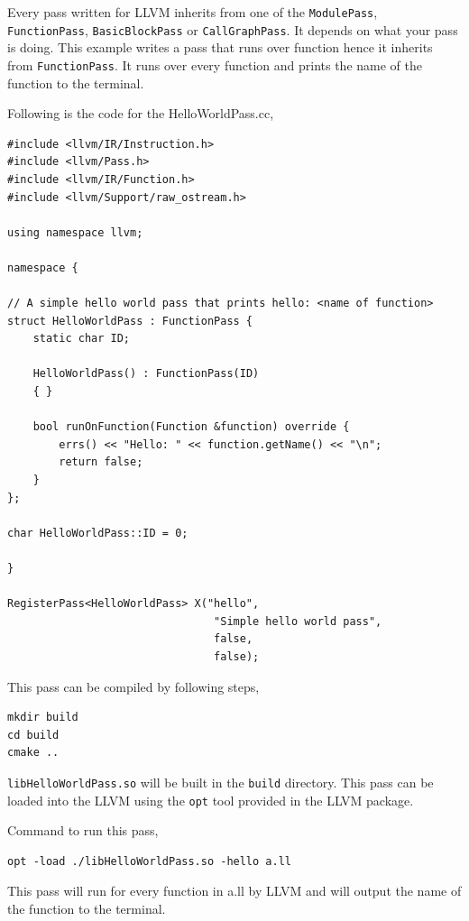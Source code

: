\documentclass[a4paper,12pt]{report}
\begin{document}
Every pass written for LLVM inherits from one of the \texttt{ModulePass}, \texttt{FunctionPass},
\texttt{BasicBlockPass} or \texttt{CallGraphPass}. It depends on what your pass is doing. This example
writes a pass that runs over function hence it inherits from \texttt{FunctionPass}.
It runs over every function and prints the name of the function to the terminal.

Following is the code for the HelloWorldPass.cc,

\begin{verbatim}
#include <llvm/IR/Instruction.h>
#include <llvm/Pass.h>
#include <llvm/IR/Function.h>
#include <llvm/Support/raw_ostream.h>

using namespace llvm;

namespace {

// A simple hello world pass that prints hello: <name of function>
struct HelloWorldPass : FunctionPass {
    static char ID;

    HelloWorldPass() : FunctionPass(ID)
    { }

    bool runOnFunction(Function &function) override {
        errs() << "Hello: " << function.getName() << "\n";
        return false;
    }
};

char HelloWorldPass::ID = 0;

}

RegisterPass<HelloWorldPass> X("hello",
                                "Simple hello world pass",
                                false,
                                false);

\end{verbatim}

This pass can be compiled by following steps,
\begin{verbatim}
mkdir build
cd build
cmake ..
\end{verbatim}

\texttt{libHelloWorldPass.so} will be built in the \texttt{build} directory. This pass
can be loaded into the LLVM using the \texttt{opt} tool provided in the LLVM package.

Command to run this pass,
\begin{verbatim}
opt -load ./libHelloWorldPass.so -hello a.ll
\end{verbatim}

This pass will run for every function in a.ll by LLVM and will output the name of
the function to the terminal.
\end{document}
